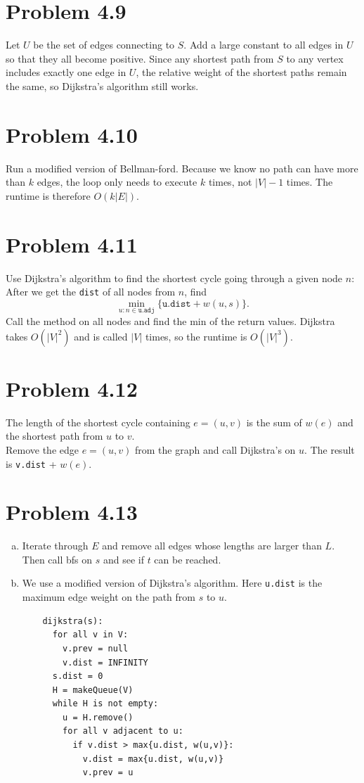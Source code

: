 \documentclass[12pt]{report}
\newcommand{\co}{\texttt}
\begin{document}
\section{Problem 4.9}
Let $U$ be the set of edges connecting to $S$. Add a large constant to all edges in $U$ so that they all become positive. Since any shortest path from $S$ to any vertex includes exactly one edge in $U$, the relative weight of the shortest paths remain the same, so Dijkstra's algorithm still works.

\section{Problem 4.10}
Run a modified version of Bellman-ford. Because we know no path can have more than $k$ edges, the loop only needs to execute $k$ times, not $|V| - 1$ times. The runtime is therefore $O(k |E|)$.

\section{Problem 4.11}
Use Dijkstra's algorithm to find the shortest cycle going through a given node $n$: After we get the \co{dist} of all nodes from $n$, find $$\min_{u : n \in \co{u.adj}} \{ \co{u.dist} + w(u,s)\}.$$
Call the method on all nodes and find the min of the return values. Dijkstra takes $O(|V|^2)$ and is called $|V|$ times, so the runtime is $O(|V|^3)$.

\section{Problem 4.12}
The length of the shortest cycle containing $e = (u,v)$ is the sum of $w(e)$ and the shortest path from $u$ to $v$. \\
Remove the edge $e = (u,v)$ from the graph and call Dijkstra's on $u$. The result is \co{v.dist} + $w(e)$.

\section{Problem 4.13}
\begin{enumerate}[(a)]
  \item Iterate through $E$ and remove all edges whose lengths are larger than $L$. Then call bfs on $s$ and see if $t$ can be reached.
  \item We use a modified version of Dijkstra's algorithm. Here \co{u.dist} is the maximum edge weight on the path from $s$ to $u$.
  \begin{lstlisting}
    dijkstra(s):
      for all v in V:
        v.prev = null
        v.dist = INFINITY
      s.dist = 0
      H = makeQueue(V)
      while H is not empty:
        u = H.remove()
        for all v adjacent to u:
          if v.dist > max{u.dist, w(u,v)}:
            v.dist = max{u.dist, w(u,v)}
            v.prev = u
  \end{lstlisting}
\end{enumerate}
\end{document}
